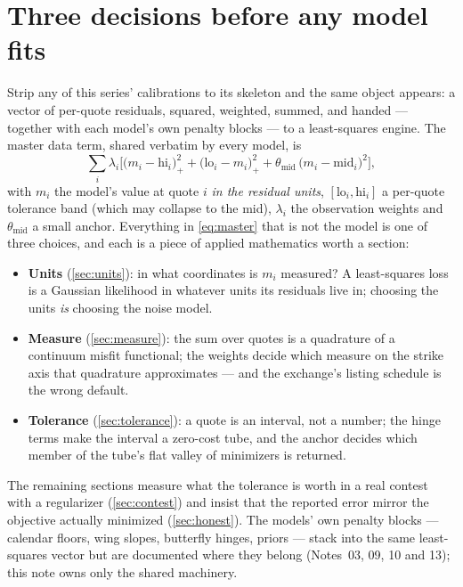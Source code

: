 \documentclass[11pt]{article}
\begin{document}
\newpage
\tableofcontents
\newpage

\section{Three decisions before any model fits}
\label{sec:three}

Strip any of this series' calibrations to its skeleton and the same object
appears: a vector of per-quote residuals, squared, weighted, summed, and
handed --- together with each model's own penalty blocks --- to a
least-squares engine.  The master data term, shared verbatim by every
model, is
\begin{equation}
\boxed{\;
\sum_i \lambda_i\Big[\big(m_i-\mathrm{hi}_i\big)_+^2
+\big(\mathrm{lo}_i-m_i\big)_+^2
+\theta_{\mathrm{mid}}\,\big(m_i-\mathrm{mid}_i\big)^2\Big],\;}
\label{eq:master}
\end{equation}
with $m_i$ the model's value at quote $i$ \emph{in the residual units},
$[\mathrm{lo}_i,\mathrm{hi}_i]$ a per-quote tolerance band (which may
collapse to the mid), $\lambda_i$ the observation weights and
$\theta_{\mathrm{mid}}$ a small anchor.  Everything in
\eqref{eq:master} that is not the model is one of three choices, and each
is a piece of applied mathematics worth a section:
\begin{itemize}[leftmargin=1.6em,itemsep=1pt]
\item \textbf{Units} (\cref{sec:units}): in what coordinates is $m_i$
measured?  A least-squares loss is a Gaussian likelihood in whatever units
its residuals live in; choosing the units \emph{is} choosing the noise
model.
\item \textbf{Measure} (\cref{sec:measure}): the sum over quotes is a
quadrature of a continuum misfit functional; the weights decide which
measure on the strike axis that quadrature approximates --- and the
exchange's listing schedule is the wrong default.
\item \textbf{Tolerance} (\cref{sec:tolerance}): a quote is an interval,
not a number; the hinge terms make the interval a zero-cost tube, and the
anchor decides which member of the tube's flat valley of minimizers is
returned.
\end{itemize}
The remaining sections measure what the tolerance is worth in a real
contest with a regularizer (\cref{sec:contest}) and insist that the
reported error mirror the objective actually minimized
(\cref{sec:honest}).  The models' own penalty blocks --- calendar floors,
wing slopes, butterfly hinges, priors --- stack into the same
least-squares vector but are documented where they belong (Notes~03, 09,
10 and 13); this note owns only the shared machinery.
\end{document}
